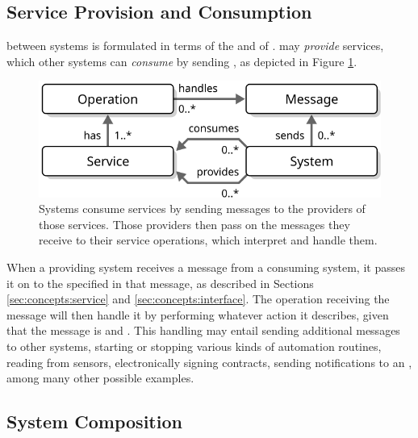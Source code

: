 \vspace*{-3mm}

\subsection{Service Provision and Consumption}

 between systems is formulated in terms of the  and  of .
 may \textit{provide} services, which other systems can \textit{consume} by sending , as depicted in Figure \ref{fig:service-consumption}.

\begin{figure}[ht!]
  \centering
  \includegraphics[scale=0.9]{figures/service-consumption}
  \caption{
    Systems consume services by sending messages to the providers of those services.
    Those providers then pass on the messages they receive to their service operations, which interpret and handle them.
  }
  \label{fig:service-consumption}
\end{figure}

When a providing system receives a message from a consuming system, it passes it on to the  specified in that message, as described in Sections \ref{sec:concepts:service} and \ref{sec:concepts:interface}.
The operation receiving the message will then handle it by performing whatever action it describes, given that the message is  and .
This handling may entail sending additional messages to other systems, starting or stopping various kinds of automation routines, reading from sensors, electronically signing contracts, sending notifications to an , among many other possible examples.

\subsection{System Composition}


